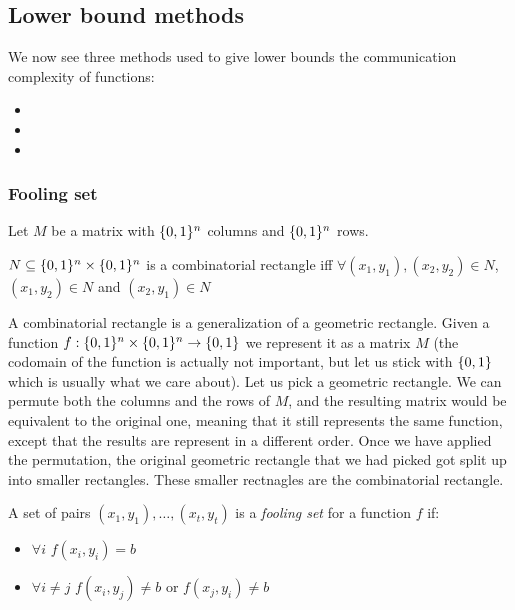 \subsection{Lower bound methods}\label{subsec:comm_compl_lower_bounds}
    We now see three methods used to give lower bounds the communication complexity of functions:
    \begin{itemize}
        \item {}
        \item {}
        \item {}
    \end{itemize}

    \subsubsection{Fooling set}\label{subsubsec:fool_set}

        \begin{definition}
            Let $M$ be a matrix with $\{ 0,1 \}^n$ columns and $\{ 0,1 \}^n$ rows.

            $N \subseteq \{ 0,1 \}^n \times \{ 0,1 \}^n$ is a combinatorial rectangle iff $\forall (x_1,y_1),(x_2,y_2) \in N$, $(x_1,y_2) \in N$ and $(x_2,y_1) \in N$
        \end{definition}

        A combinatorial rectangle is a generalization of a geometric rectangle.
        Given a function $f : \{ 0,1 \}^n \times \{ 0,1 \}^n \rightarrow \{ 0,1 \}$ we represent it as a matrix $M$ (the codomain of the function is actually not important, but let us stick with $\{ 0,1 \}$ which is usually what we care about).
        Let us pick a geometric rectangle. We can permute both the columns and the rows of $M$, and the resulting matrix would be equivalent to the original one, meaning that it still represents the same function,
        except that the results are represent in a different order. Once we have applied the permutation, the original geometric rectangle that we had picked got split up into smaller rectangles.
        These smaller rectnagles are the combinatorial rectangle.

        \begin{definition}\label{def:fooling_set}
            A set of pairs $(x_1,y_1), \dots, (x_t, y_t)$ is a \textit{fooling set} for a function $f$ if:
            \begin{itemize}
                \item $\forall i$ $f(x_i, y_i) = b$
                \item $\forall i \neq j$ $f(x_i, y_j) \neq b$ or $f(x_j, y_i) \neq b$
            \end{itemize}
        \end{definition}

